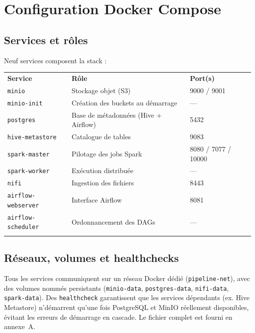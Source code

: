 \documentclass[11pt,a4paper]{report}
\let\oldtoprule\toprule
\renewcommand{\toprule}{\arrayrulecolor{corpslate}\oldtoprule\arrayrulecolor{black}}
\let\oldmidrule\midrule
\renewcommand{\midrule}{\arrayrulecolor{emsigreen}\oldmidrule\arrayrulecolor{black}}
\let\oldbottomrule\bottomrule
\renewcommand{\bottomrule}{\arrayrulecolor{corpslate}\oldbottomrule\arrayrulecolor{black}}
\begin{document}
\section{Configuration Docker Compose}

\subsection{Services et rôles}
Neuf services composent la stack :

\begin{center}
\begin{tabular}{@{}lll@{}}
\toprule
\rowcolor{corpslate!10}
\textbf{Service} & \textbf{Rôle} & \textbf{Port(s)} \\
\midrule
\texttt{minio} & Stockage objet (S3) & 9000 / 9001 \\
\texttt{minio-init} & Création des buckets au démarrage & — \\
\texttt{postgres} & Base de métadonnées (Hive + Airflow) & 5432 \\
\texttt{hive-metastore} & Catalogue de tables & 9083 \\
\texttt{spark-master} & Pilotage des jobs Spark & 8080 / 7077 / 10000 \\
\texttt{spark-worker} & Exécution distribuée & — \\
\texttt{nifi} & Ingestion des fichiers & 8443 \\
\texttt{airflow-webserver} & Interface Airflow & 8081 \\
\texttt{airflow-scheduler} & Ordonnancement des DAGs & — \\
\bottomrule
\end{tabular}
\end{center}


\subsection{Réseaux, volumes et healthchecks}
Tous les services communiquent sur un réseau Docker dédié
(\texttt{pipeline-net}), avec des volumes nommés persistants
(\texttt{minio-data}, \texttt{postgres-data}, \texttt{nifi-data},
\texttt{spark-data}). Des \texttt{healthcheck} garantissent que les
services dépendants (ex. Hive Metastore) n'démarrent qu'une fois
PostgreSQL et MinIO réellement disponibles, évitant les erreurs de
démarrage en cascade. Le fichier complet est fourni en annexe~A.
\end{document}
